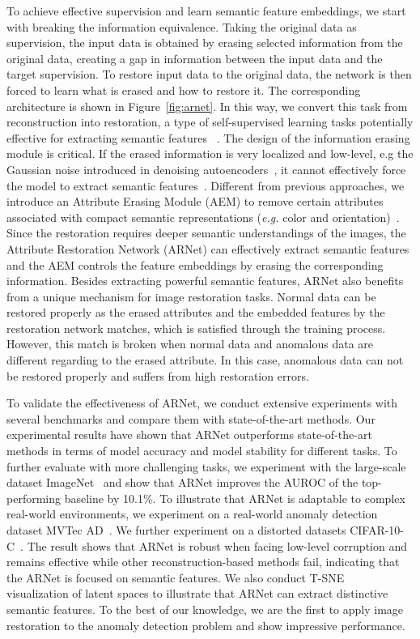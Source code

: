 \documentclass[journal]{IEEEtran}
\begin{document}
To achieve effective supervision and learn semantic feature embeddings, we start with breaking the information equivalence. Taking the original data as supervision, the input data is obtained by erasing selected information from the original data, creating a gap in information between the input data and the target supervision. To restore input data to the original data, the network is then forced to learn what is erased and how to restore it. The corresponding architecture is shown in Figure~\ref{fig:arnet}. In this way, we convert this task from reconstruction into restoration, a type of self-supervised learning tasks potentially effective for extracting semantic features ~\cite{pathak2016context, Jenni_2018_CVPR, zhang2016colorful}.
The design of the information erasing module is critical. If the erased information is very localized and low-level, e.g the Gaussian noise introduced in denoising autoencoders~\cite{vincent2008extracting}, it cannot effectively force the model to extract semantic features~\cite{pathak2016context}. Different from previous approaches, we introduce an Attribute Erasing Module (AEM) to remove certain attributes associated with compact semantic representations (\emph{e.g.}  color and orientation)~\cite{zhang2016colorful,long2017towards}. Since the restoration requires deeper semantic understandings of the images, the Attribute Restoration Network (ARNet) can effectively extract semantic features and the AEM controls the feature embeddings by erasing the corresponding information. Besides extracting powerful semantic features, ARNet also benefits from a unique mechanism for image restoration tasks.
Normal data can be restored properly as the erased attributes and the embedded features by the restoration network matches, which is satisfied through the training process. 
However, this match is broken when normal data and anomalous data are different regarding to the erased attribute. In this case, anomalous data can not be restored properly and suffers from high restoration errors. 

To validate the effectiveness of ARNet, we conduct extensive experiments with several benchmarks and compare them with state-of-the-art methods. Our experimental results have shown that ARNet outperforms state-of-the-art methods in terms of model accuracy and model stability for different tasks. To further evaluate with more challenging tasks, we experiment with the large-scale dataset ImageNet~\cite{russakovsky2015imagenet} and show that ARNet improves the AUROC of the top-performing baseline by 10.1\%. To illustrate that ARNet is adaptable to complex real-world environments, we experiment on a real-world anomaly detection dataset MVTec AD~\cite{bergmann2019mvtec}. We further experiment on a distorted datasets CIFAR-10-C~\cite{hendrycks2018benchmarking}. The result shows that ARNet is robust when facing low-level corruption and remains effective while other reconstruction-based methods fail, indicating that the ARNet is focused on semantic features. We also conduct T-SNE~\cite{maaten2008visualizing} visualization of latent spaces to illustrate that ARNet can extract distinctive semantic features. To the best of our knowledge, we are the first to apply image restoration to the anomaly detection problem and show impressive performance.
\end{document}
